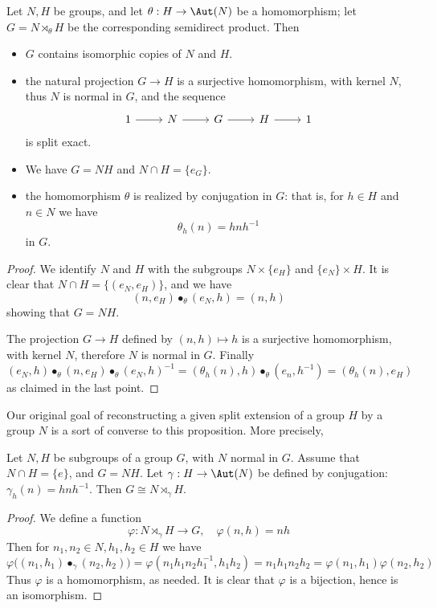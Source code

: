 \begin{proposition}\label{semiprod prop}
Let $N,H$ be groups, and let $\theta:H\to\Aut(N)$ be a homomorphism; let $G=N\rtimes_\theta H$ be the corresponding semidirect product. Then
\begin{itemize}
\item $G$ contains isomorphic copies of $N$ and $H$.
\item the natural projection $G\to H$ is a surjective homomorphism, with kernel $N$, thus $N$ is normal in $G$, and the sequence
\[\begin{tikzcd}
1\ar[r]&N\ar[r]&G\ar[r]&H\ar[r]&1
\end{tikzcd}\]
is split exact.
\item We have $G=NH$ and $N\cap H=\{e_G\}$.
\item the homomorphism $\theta$ is realized by conjugation in $G$: that is, for $h\in H$ and $n\in N$ we have
\[\theta_h(n)=hnh^{-1}\]
in $G$.
\end{itemize}
\end{proposition}
\begin{proof}
We identify $N$ and $H$ with the subgroups $N\times\{e_H\}$ and $\{e_N\}\times H$. It is clear that $N\cap H=\{(e_N,e_H)\}$, and we have
\[(n,e_H)\bullet_\theta(e_N,h)=(n,h)\]
showing that $G=NH$.\par
The projection $G\to H$ defined by $(n,h)\mapsto h$ is a surjective homomorphism, with kernel $N$, therefore $N$ is normal in $G$. Finally 
\[(e_N,h)\bullet_\theta(n,e_H)\bullet_\theta(e_N,h)^{-1}=(\theta_h(n),h)\bullet_\theta(e_n,h^{-1})=(\theta_h(n),e_H)\]
as claimed in the last point.
\end{proof}
Our original goal of reconstructing a given split extension of a group $H$ by a
group $N$ is a sort of converse to this proposition. More precisely,
\begin{proposition}\label{semiprod if}
Let $N,H$ be subgroups of a group $G$, with $N$ normal in $G$. Assume that $N\cap H=\{e\}$, and $G=NH$. Let $\gamma:H\to\Aut(N)$ be defined by conjugation: $\gamma_h(n)=hnh^{-1}$. Then $G\cong N\rtimes_\gamma H$.
\end{proposition}
\begin{proof}
We define a function 
\[\varphi:N\rtimes_\gamma H\to G,\quad\varphi(n,h)=nh\]
Then for $n_1,n_2\in N,h_1,h_2\in H$ we have
\[\varphi\big((n_1,h_1)\bullet_\gamma(n_2,h_2)\big)=\varphi(n_1h_1n_2h_1^{-1},h_1h_2)=n_1h_1n_2h_2=\varphi(n_1,h_1)\varphi(n_2,h_2)\]
Thus $\varphi$ is a homomorphism, as needed. It is clear that $\varphi$ is a bijection, hence is an isomorphism.
\end{proof}
